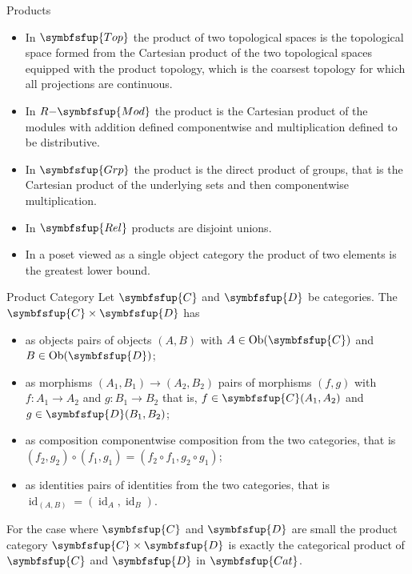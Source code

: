 \documentclass[fleqn]{NotesClass}
\makeatletter
\newcommand{\cat}[1]{\symbfsfup{#1}}
\newcommand{\c@egory}[1]{\symbfsfup{#1}}
\newcommand{\Rel}{\c@egory{Rel}}
\newcommand{\Grp}{\c@egory{Grp}}
\newcommand{\RMod}[1][R]{#1{-}\c@egory{Mod}}
\newcommand{\Top}{\c@egory{Top}}
\newcommand{\Cat}{\c@egory{Cat}}
\DeclareMathOperator{\Ob}{Ob}
\DeclareMathOperator{\id}{id}
\makeatother
\begin{document}
    \begin{exm}{Products}{}
        \begin{itemize}
            \item In \(\Top\) the product of two topological spaces is the topological space formed from the Cartesian product of the two topological spaces equipped with the product topology, which is the coarsest topology for which all projections are continuous.
            \item In \(\RMod\) the product is the Cartesian product of the modules with addition defined componentwise and multiplication defined to be distributive.
            \item In \(\Grp\) the product is the direct product of groups, that is the Cartesian product of the underlying sets and then componentwise multiplication.
            \item In \(\Rel\) products are disjoint unions.
            \item In a poset viewed as a single object category the product of two elements is the greatest lower bound.
        \end{itemize}
    \end{exm}
    
    \begin{dfn}{Product Category}{}
        Let \(\cat{C}\) and \(\cat{D}\) be categories.
        The  \(\cat{C} \times \cat{D}\) has
        \begin{itemize}
            \item as objects pairs of objects \((A, B)\) with \(A \in \Ob(\cat{C})\) and \(B \in \Ob(\cat{D})\);
            \item as morphisms \((A_1, B_1) \to (A_2, B_2)\) pairs of morphisms \((f, g)\) with \(f \colon A_1 \to A_2\) and \(g \colon B_1 \to B_2\) that is, \(f \in \cat{C}(A_1, A_2)\) and \(g \in \cat{D}(B_1, B_2)\);
            \item as composition componentwise composition from the two categories, that is \((f_2, g_2) \circ (f_1, g_1) = (f_2 \circ f_1, g_2 \circ g_1)\);
            \item as identities pairs of identities from the two categories, that is \(\id_{(A, B)} = (\id_A, \id_B)\).
        \end{itemize}
    \end{dfn}
    
    For the case where \(\cat{C}\) and \(\cat{D}\) are small the product category \(\cat{C} \times \cat{D}\) is exactly the categorical product of \(\cat{C}\) and \(\cat{D}\) in \(\Cat\).
    
\end{document}
